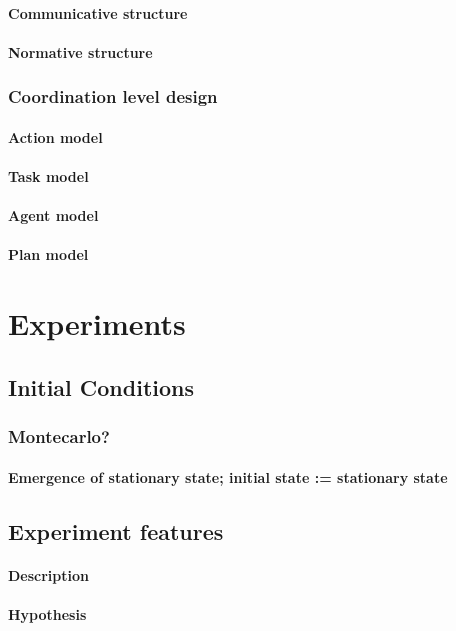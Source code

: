 \documentclass{report}
\begin{document}
\begin{enumeration}
\begin{end}
				\paragraph{Communicative structure}
				\paragraph{Normative structure}

			\subsubsection{Coordination level design}
				\paragraph{Action model}
				\paragraph{Task model}
				\paragraph{Agent model}
				\paragraph{Plan model}
	\section{Experiments}
		\subsection{Initial Conditions}
			\subsubsection{Montecarlo?} 
			\paragraph{Emergence of stationary state; initial state := stationary state}
		\subsection{Experiment features}
			\paragraph{Description}
			\paragraph{Hypothesis}

\end{end}
\end{enumeration}
\end{document}
